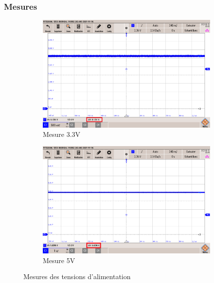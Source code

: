 {	\clearpage
	
	\subsubsection{Mesures}
	
	\begin{figure}
		\begin{subfigure}{.5\textwidth}
			\centering
			\includegraphics[width=\textwidth]{Mesures/Tension3.3V}
			\caption{Mesure 3.3V}
			\label{fig:Mes3.3V}
		\end{subfigure}
		\begin{subfigure}{.5\textwidth}
			\centering
			\includegraphics[width=\textwidth]{Mesures/Tension5V}
			\caption{Mesure 5V}
			\label{fig:Mes5V}
		\end{subfigure}
		\caption{Mesures des tensions d'alimentation}
		\label{fig:Mesure3.3et5V}
	\end{figure}
	
}
